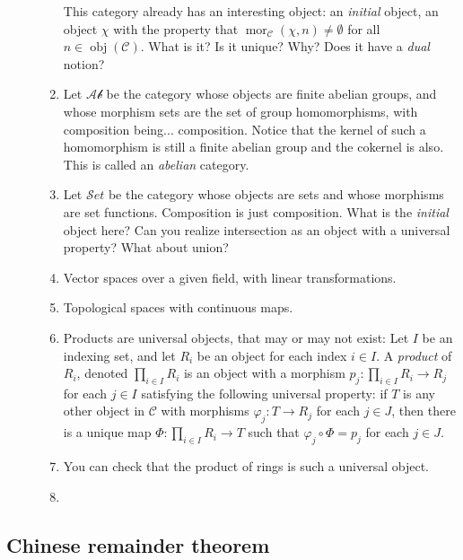 \documentclass[12pt]{article}
\newcommand{\Ab}{\mathcal{Ab}}
\newcommand{\obj}{\operatorname{obj}}
\newcommand{\mor}{\operatorname{mor}}
\newcommand{\calC}{\mathcal{C}}
\begin{document}
\begin{description}
\begin{enumerate}
This category already has an interesting object: an \emph{initial}
object, an object $\chi$ with the property that
$\mor_\calC(\chi,n)\neq \emptyset$ for all $n\in \obj(\calC)$. What is
it? Is it unique? Why? Does it have a \emph{dual} notion?
\item Let $\Ab$ be the category whose objects are finite abelian
  groups, and whose morphism sets are the set of group
  homomorphisms, with composition being... composition. Notice that the kernel of such a homomorphism is
  still a finite abelian group and the cokernel is also. This is
  called an \emph{abelian} category. 
\item Let $\mathcal{S}et$ be the category whose objects are sets and whose
  morphisms are set functions. Composition is just composition. What
  is the \emph{initial} object here? Can you realize intersection as
  an object with a universal property? What about union?
\item Vector spaces over a given field, with linear transformations. 
\item Topological spaces with continuous maps.
\item Products are universal objects, that may or may not exist:
   Let $I$ be an indexing set, and let $R_i$ be an
  object for each index $i\in I$. A \emph{product} of $R_i$, denoted
  $\prod\limits_{i\in I} R_i$ is an object with a morphism $p_j:
  \prod\limits_{i\in I} R_i \rightarrow R_j$ for each $j\in I$
  satisfying the following universal property: if $T$ is any other
  object in $\calC$ with morphisms $\varphi_j: T\rightarrow R_j$ for
  each $j\in J$, then there is a unique map $\Phi: \prod\limits_{i\in
    I} R_i\rightarrow T$ such that $\varphi_j \circ \Phi = p_j$ for
  each $j\in J$. 
\item You can check that the product of rings is such a universal
  object. 
\item 
  \end{enumerate}

\end{description}


\subsection{Chinese remainder theorem}
\label{sec:chin-rema-theor}
\end{document}
